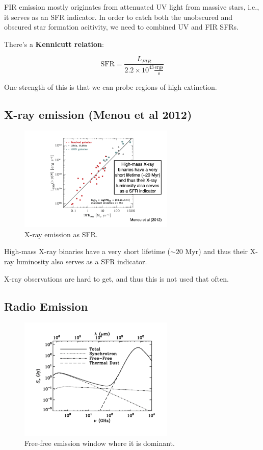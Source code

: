 \documentclass{article}
\begin{document}
FIR emission mostly originates from attenuated UV light from massive stars, i.e., it serves as an SFR indicator. In order to catch both the unobscured and obscured star formation acitivity, we need to combined UV and FIR SFRs. 

There's a \textbf{Kennicutt relation}:

\begin{equation}
    \text{SFR} = \frac{L_{FIR}}{2.2\times 10^{43} \frac{\text{ergs}}{\text{s}}}
\end{equation}

One strength of this is that we can probe regions of high extinction.

\subsection{X-ray emission (Menou et al 2012)}

\begin{figure}
    \centering
    \includegraphics[width=0.66\textwidth]{figs/Screen Shot 2021-09-24 at 3.38.58 PM.png}
    \caption{X-ray emission as SFR.}
    \label{fig:xray_Sfr}
\end{figure}

High-mass X-ray binaries have a very short lifetime ($\sim 20$ Myr) and thus their X-ray luminosity also serves as a SFR indicator. 

X-ray observations are hard to get, and thus this is not used that often. 

\subsection{Radio Emission}

\begin{figure}
    \centering
    \includegraphics[width=0.66\textwidth]{figs/Screen Shot 2021-09-24 at 3.39.38 PM.png}
    \caption{Free-free emission window where it is dominant. }
    \label{fig:FreeFree}
\end{figure}
\end{document}
